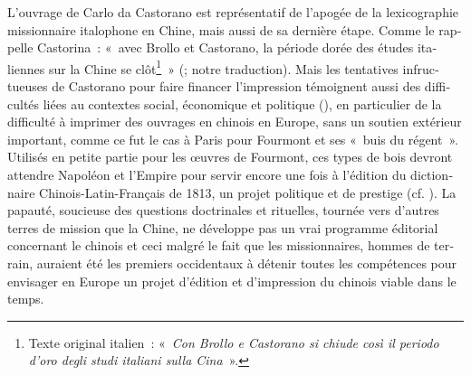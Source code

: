 \documentclass[output=paper,colorlinks,citecolor=brown,arabicfont,chinesefont,booklanguage=french]{langscibook}
\begin{document}
\begin{otherlanguage}{french}
L’ouvrage de Carlo da Castorano est représentatif de l’apogée de la lexicographie missionnaire italophone en Chine, mais aussi de sa dernière étape. Comme le rappelle Castorina~: «~avec Brollo et Castorano, la période dorée des études italiennes sur la Chine se clôt\footnote{Texte original italien~: «~\emph{Con Brollo e Castorano si chiude così il periodo d’oro degli studi italiani sulla Cina}~».}~» (\citealt[79]{Castorina2019}; notre traduction). Mais les tentatives infructueuses de Castorano pour faire financer l’impression témoignent aussi des difficultés liées au contextes social, économique et politique (\citealt{Raini2017, Castorina2019}), en particulier de la difficulté à imprimer des ouvrages en chinois en Europe, sans un soutien extérieur important, comme ce fut le cas à Paris pour Fourmont et ses «~buis du régent~». Utilisés en petite partie pour les œuvres de Fourmont, ces types de bois devront attendre Napoléon et l’Empire pour servir encore une fois à l’édition du dictionnaire Chinois-Latin-Français de 1813, un projet politique et de prestige (cf. \citealt{BussottiLandry-deron2020}). La papauté, soucieuse des questions doctrinales et rituelles, tournée vers d’autres terres de mission que la Chine, ne développe pas un vrai programme éditorial concernant le chinois et ceci malgré le fait que les missionnaires, hommes de terrain, auraient été les premiers occidentaux à détenir toutes les compétences pour envisager en Europe un projet d’édition et d’impression du chinois viable dans le temps.

{\sloppy\printbibliography[heading=subbibliography,notkeyword=this]}
\end{otherlanguage}

\renewcommand{\tabref}[1]{Table~\ref{#1}}
\end{document}
